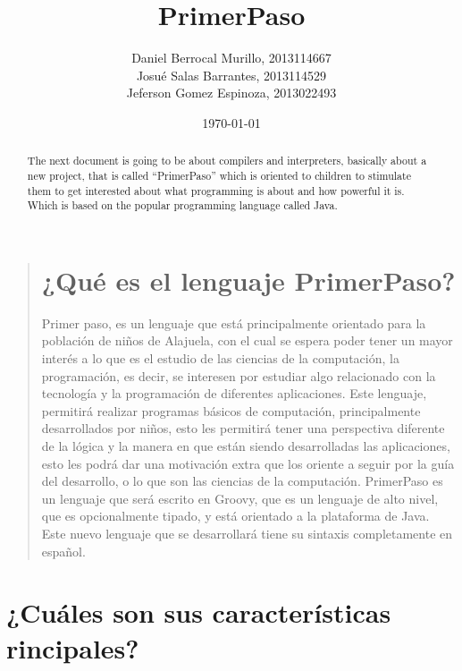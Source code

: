 \documentclass[%
 aip,
 jmp,%
 amsmath,amssymb,
 reprint,%
]{revtex4-1}
\begin{document}

\title[PrimerPaso, la nueva herramienta de desarrollo para niños]{PrimerPaso}%


\author{Daniel Berrocal Murillo, 2013114667\\Josué Salas Barrantes, 2013114529\\Jeferson Gomez Espinoza, 2013022493}



\date{\today}
\begin{abstract}

The next document is going to be about compilers and interpreters, basically about a new project, that is called “PrimerPaso” which is oriented to children to stimulate them to get interested about what programming is about and how powerful it is. Which is based on the popular programming language called Java.
\end{abstract}

\maketitle

\begin{quotation}
\section{¿Qué es el lenguaje PrimerPaso?}
Primer paso, es un lenguaje que está principalmente orientado para la población de niños de Alajuela, con el cual se espera poder tener un mayor interés a lo que es el estudio de las ciencias de la computación, la programación, es decir, se interesen por estudiar algo relacionado con la tecnología y la programación de diferentes aplicaciones.
Este lenguaje, permitirá realizar programas básicos de computación, principalmente desarrollados por niños, esto les permitirá tener una perspectiva diferente de la lógica y la manera en que están siendo desarrolladas las aplicaciones, esto les podrá dar una motivación extra que los oriente a seguir por la guía del desarrollo, o lo que son las ciencias de la computación. PrimerPaso es un lenguaje que será escrito en Groovy, que es un lenguaje de alto nivel, que es opcionalmente tipado, y está orientado a la plataforma de Java. Este nuevo lenguaje que se desarrollará tiene su sintaxis  completamente en español.
\end{quotation}

\section{\label{sec:level1}¿Cuáles son sus características rincipales?}
\end{document}
